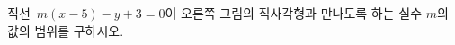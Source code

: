 \noindent\begin{minipage}[t]{0.58\linewidth}\vspace{0pt}\raggedright 직선~$m(x-5)-y+3=0$이 오른쪽 그림의 직사각형과 만나도록 하는 실수 $m$의 값의 범위를 구하시오.\end{minipage}\hfill\begin{minipage}[t]{0.4\linewidth}\vspace{0pt}\centering \resizebox{\ifdim\width>\linewidth\linewidth\else\width\fi}{!}{}\end{minipage}\par
